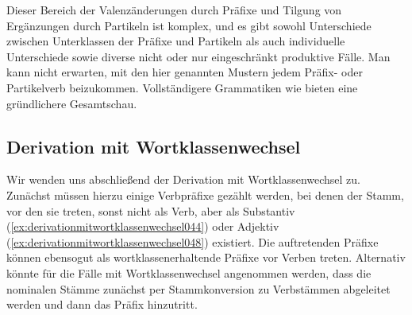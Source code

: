 \begin{exe}
  \ex \label{ex:derivationohnewortklassenwechsel040}
  \begin{xlist}
  \end{xlist}
\end{exe}

Dieser Bereich der Valenzänderungen durch Präfixe und Tilgung von Ergänzungen durch Partikeln ist komplex, und es gibt sowohl Unterschiede zwischen Unterklassen der Präfixe und Partikeln als auch individuelle Unterschiede sowie diverse nicht oder nur eingeschränkt produktive Fälle.
Man kann nicht erwarten, mit den hier genannten Mustern jedem Präfix- oder Partikelverb beizukommen.
Vollständigere Grammatiken wie \citet{Eisenberg2013a} bieten eine gründlichere Gesamtschau.

\subsection{Derivation mit Wortklassenwechsel}
\label{sec:derivationmitwortklassenwechsel}


Wir wenden uns abschließend der Derivation mit Wortklassenwechsel zu.
Zunächst müssen hierzu einige Verbpräfixe gezählt werden, bei denen der Stamm, vor den sie treten, sonst nicht als Verb, aber als Substantiv (\ref{ex:derivationmitwortklassenwechsel044}) oder Adjektiv (\ref{ex:derivationmitwortklassenwechsel048}) existiert.
Die auftretenden Präfixe können \idR ebensogut als wortklassenerhaltende Präfixe vor Verben treten.
Alternativ könnte für die Fälle mit Wortklassenwechsel angenommen werden, dass die nominalen Stämme zunächst per Stammkonversion zu Verbstämmen abgeleitet werden und dann das Präfix hinzutritt.

\begin{exe}
  \ex\label{ex:derivationmitwortklassenwechsel044}
  \begin{xlist}
  \end{xlist}
  \ex\label{ex:derivationmitwortklassenwechsel048}
  \begin{xlist}
  \end{xlist}
\end{exe}

